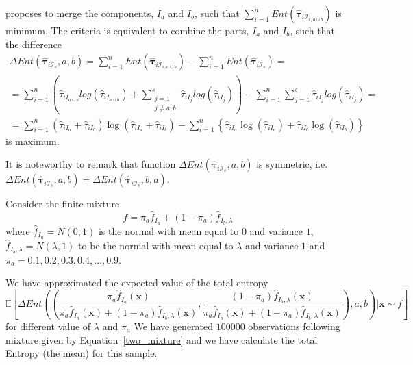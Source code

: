 \documentclass[10pt, a4paper]{article}
\newcommand{\m}[1]{\boldsymbol{#1}}
\begin{document}
 \cite{baudry2010combining} proposes to merge the components, $I_a$ and $I_b$, such that $\sum_{i=1}^n Ent( \hat{\m \tau}_{i \mathcal{I}_{s, a \cup b}} )$ is minimum. The criteria is equivalent to combine the parts, $I_a$ and $I_b$, such that the difference 
\begin{multline*}
\Delta Ent(\hat{\m \tau}_{i \mathcal{I}_s}, a, b) = \sum_{i=1}^n Ent( \hat{\m \tau}_{i \mathcal{I}_{s, a \cup b}}) - \sum_{i=1}^n Ent( \hat{\m \tau}_{i \mathcal{I}_s}) =  \\ = \sum_{i=1}^n  \left( \hat{\tau}_{i I_{a\cup b}}  log(\hat{\tau}_{i I_{a\cup b}} ) +  \sum_{\substack{j=1 \\
                                                            j \neq a, b}}^s \hat{\tau}_{i I_j}  log(\hat{\tau}_{i I_j} ) \right)  - \sum_{i=1}^n \sum_{j=1}^s \hat{\tau}_{i I_j}  log(\hat{\tau}_{i I_j} ) = \\  =   \sum_{i=1}^n  (\hat{\tau}_{iI_a}+\hat{\tau}_{iI_b}) \log(\hat{\tau}_{iI_a} + \hat{\tau}_{iI_b}) - \sum_{i=1}^n \left\{ \hat{\tau}_{iI_a} \log(\hat{\tau}_{iI_a}) + \hat{\tau}_{iI_b} \log(\hat{\tau}_{iI_b})\right\}
\end{multline*}
is maximum.

It is noteworthy to remark that function $\Delta Ent(\hat{\m \tau}_{i \mathcal{I}_s}, a, b)$ is symmetric, i.e. $\Delta Ent(\hat{\m \tau}_{i \mathcal{I}_s}, a, b) = \Delta Ent(\hat{\m \tau}_{i \mathcal{I}_s}, b, a)$.

Consider the finite mixture
\begin{equation}\label{two_mixture}
f = \pi_a \hat{f}_{I_a} + (1 - \pi_a) \hat{f}_{I_b, \lambda}
\end{equation}
where $\hat{f}_{I_a} = N(0, 1)$ is the normal with mean equal to $0$ and variance $1$, $\hat{f}_{I_b, \lambda} = N(\lambda, 1)$ to be the normal with mean equal to $\lambda$ and variance $1$ and $\pi_a = 0.1, 0.2, 0.3, 0.4, \dots, 0.9$. 

We have approximated the expected value of the total entropy
\[
\mathbb{E}\left[ \Delta Ent\left(
 \left( 
 \frac{\pi_a \hat{f}_{I_a}(\m x)}{\pi_a \hat{f}_{I_a}(\m x) + (1-\pi_a) \hat{f}_{I_b, \lambda}(\m x)}, 
 \frac{(1-\pi_a) \hat{f}_{I_b, \lambda}(\m x)}{\pi_a \hat{f}_{I_a}(\m x) + (1-\pi_a) \hat{f}_{I_b, \lambda}(\m x)} \right), a, b\right) | \m x \sim f \right]
\]
for different value of $\lambda$ and $\pi_a$
We have generated $100000$ observations following mixture given by Equation~\ref{two_mixture} 
and we have calculate the total Entropy (the mean) for this sample.
\end{document}

